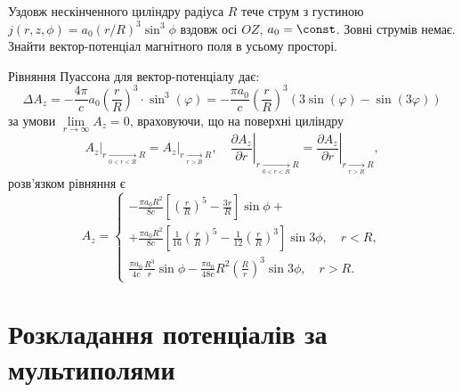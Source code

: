 \begin{problem}
Уздовж нескінченного циліндру радіуса $R$ тече струм з густиною $j(r,z,\phi) = a_0(r/R)^3 \sin^3\phi$ вздовж осі $OZ$, $a_0 = \const$. Зовні струмів немає. Знайти вектор-потенціал магнітного поля в усьому просторі.
\begin{solution}
	Рівняння Пуассона для вектор-потенціалу дає:
	\[\Delta {A_z} =  - \frac{{4\pi }}{c}{a_0}{\left( {\frac{r}{R}} \right)^3} \cdot {\sin ^3}(\varphi ) =  - \frac{{\pi {a_0}}}{c}{\left( {\frac{r}{R}} \right)^3}\left( {3\sin (\varphi ) - \sin (3\varphi )} \right)
	\]
    за умови $\lim\limits_{r\to\infty} A_z = 0$, враховуючи, що на поверхні циліндру
    \[
        \left. A_z\right|_{r \underset{0<r<R}{\to} R} = \left. A_z\right|_{r \underset{r>R}{\to} R}, \quad  \left. \frac{\partial A_z}{\partial r}\right|_{r \underset{0<r<R}{\to} R} = \left. \frac{\partial A_z}{\partial r}\right|_{r \underset{r>R}{\to} R},
    \]
розв'язком рівняння є
	\[
		A_z =
		\begin{cases}
			- \frac{\pi a_0R^2}{8c}\left[ \left( \frac{r}{R} \right)^5 - \frac{3r}{R} \right] \sin\phi  + \\ +  \frac{\pi a_0R^2}{8c}\left[ \frac{1}{16}{\left( \frac{r}{R} \right)^5} - \frac{1}{12} \left( \frac{r}{R} \right)^3 \right]  \sin3\phi, \quad r < R, \\
			\frac{\pi a_0}{4c}\frac{R^3}{r} \sin\phi  - \frac{{\pi {a_0}}}{{48c}}{R^2}{\left( {\frac{R}{r}} \right)^3}  \sin3\phi, \quad r > R.
		\end{cases}
	\]
\end{solution}
\end{problem}

\section{Розкладання потенціалів за мультиполями}


